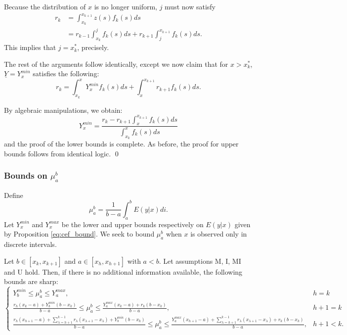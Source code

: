 Because the distribution of $x$ is no longer uniform, $j$ must now satisfy 
\begin{align*}
r_k &= \int_{x_k}^{x_{k+1}} z(s)f_k(s) ds \\ 
&= r_{k-1} \int_{x_k}^j f_k(s)ds + r_{k+1} \int_{j}^{x_{k+1}}
f_k(s)ds. 
\end{align*} 
This implies that $j = x_k^*$, precisely. 

The rest of the arguments follow identically, except we now claim that
for $x > x_k^*$, 
$\underline{Y} = Y_{x}^{min}$ satisfies the following: 
$$ r_k = \int_{x_k}^{x} Y_{x}^{min} f_k(s)ds + \int_{x}^{x_{k+1}}
r_{k+1} f_k(s)ds.$$ 

By algebraic manipulations, we obtain: 
$$ Y_{x}^{min}= \frac{r_k - r_{k+1} \int_{x}^{x_{k+1}}
f_k(s)ds}{\int_{x_k}^{x}  f_k(s)ds}$$ and the proof of the lower
bounds is complete. As before, the proof for upper bounds follows from identical logic. \qed 

\subsubsection{Bounds on $\mu_a^b$}
Define $$  \mu_a^{b} = \frac{1}{b - a} \int_a^{b} E(y | x) di. $$ Let
$Y_x^{min}$ and $Y_x^{max}$ be the lower and upper bounds respectively
on $E(y | x)$ given by Proposition \ref{eq:cef_bound}. 
We seek to bound $\mu_a^b$ when $x$ is observed only in discrete intervals. 

\begin{proposition}
  \label{eq:mu} 
  Let $b \in [x_k, x_{k+1}]$ and $a \in [x_h, x_{h+1}]$ with $a<b$. Let
  assumptions M, I, MI \citep{Manski2002} and U hold. Then, if there is no
  additional information available, the
  following bounds are sharp: 
  \label{eq:bound_mu} 
$$ 
  \begin{cases} 
     Y_b^{min} \leq \mu_a^b \leq Y_a^{max}, & h = k \\
    \frac{r_h (x_k - a) + Y_b^{min}(b - x_k)}{b-a} \leq
    \mu_a^b \leq \frac{Y_a^{max} (x_k - a) + r_k
      (b-x_k)}{b-a}, & h +
    1 = k \\
    \frac{r_h (x_{h+1} - a) + \sum_{\lambda = h+1}^{k-1} r_{\lambda}
      (x_{\lambda+1} - x_{\lambda}) + Y_b^{min}(b - x_k)}{b-a} \leq
    \mu_a^b 
    \leq \frac{Y_a^{max} (x_{h+1} - a) + \sum_{\lambda = h+1}^{k-1} r_{\lambda}
      (x_{\lambda+1} - x_{\lambda}) + r_k (b-x_k)}{b-a}, & h +
    1 < k. 
  \end{cases} 
$$ 
\end{proposition} 

